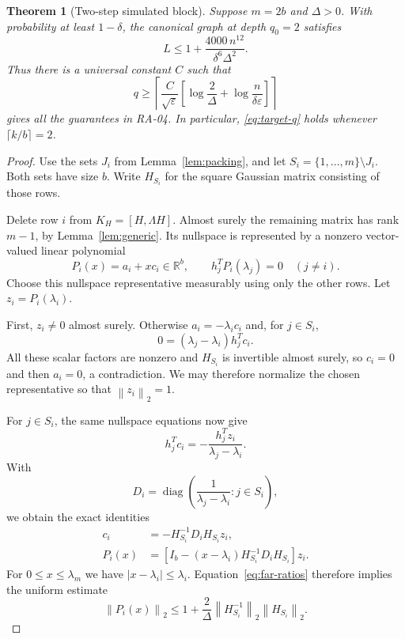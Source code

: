 \documentclass[11pt]{article}
\newtheorem{theorem}{Theorem}[section]
\theoremstyle{definition}
\newcommand{\R}{\mathbb R}
\newcommand{\diag}{\operatorname{diag}}
\newcommand{\norm}[1]{\left\lVert #1\right\rVert}
\begin{document}
\begin{theorem}[Two-step simulated block]
\label{thm:t2}
Suppose $m=2b$ and $\Delta>0$. With probability at least $1-\delta$, the
canonical graph at depth $q_0=2$ satisfies
\begin{equation}
 L\leq 1+\frac{4000\,n^{12}}{\delta^6\Delta^2}.
 \label{eq:t2-L}
\end{equation}
Thus there is a universal constant $C$ such that
\begin{equation}
 q\geq\left\lceil\frac C{\sqrt\varepsilon}
       \left[\log\frac2\Delta+\log\frac n{\delta\varepsilon}\right]
       \right\rceil
 \label{eq:t2-q}
\end{equation}
gives all the guarantees in RA-04. In particular,
\eqref{eq:target-q} holds whenever $\lceil k/b\rceil=2$.
\end{theorem}
\begin{proof}
Use the sets $J_i$ from Lemma~\ref{lem:packing}, and let
$S_i=\{1,\ldots,m\}\setminus J_i$. Both sets have size $b$.
Write $H_{S_i}$ for the square Gaussian matrix consisting of those rows.

Delete row $i$ from $K_H=[H,\Lambda H]$. Almost surely the remaining matrix
has rank $m-1$, by Lemma~\ref{lem:generic}. Its nullspace is represented by a
nonzero vector-valued linear polynomial
\[
 P_i(x)=a_i+xc_i\in\R^b,
 \qquad h_j^TP_i(\lambda_j)=0\quad(j\ne i).
\]
Choose this nullspace representative measurably using only the other rows.
Let $z_i=P_i(\lambda_i)$.

First, $z_i\ne0$ almost surely. Otherwise $a_i=-\lambda_i c_i$ and, for
$j\in S_i$,
\[
 0=(\lambda_j-\lambda_i)h_j^Tc_i.
\]
All these scalar factors are nonzero and $H_{S_i}$ is invertible almost
surely, so $c_i=0$ and then $a_i=0$, a contradiction. We may therefore
normalize the chosen representative so that $\norm{z_i}_2=1$.

For $j\in S_i$, the same nullspace equations now give
\[
 h_j^Tc_i=-\frac{h_j^Tz_i}{\lambda_j-\lambda_i}.
\]
With
\[
 D_i=\diag\left(\frac1{\lambda_j-\lambda_i}:j\in S_i\right),
\]
we obtain the exact identities
\begin{align}
 c_i&=-H_{S_i}^{-1}D_iH_{S_i}z_i,\label{eq:t2-slope}\\
 P_i(x)&=\left[I_b-(x-\lambda_i)H_{S_i}^{-1}D_iH_{S_i}\right]z_i.
 \label{eq:t2-extrapolation}
\end{align}
For $0\leq x\leq\lambda_m$ we have $|x-\lambda_i|\leq\lambda_i$.
Equation~\eqref{eq:far-ratios} therefore implies the uniform estimate
\begin{equation}
 \norm{P_i(x)}_2\leq
       1+\frac2\Delta\norm{H_{S_i}^{-1}}_2\norm{H_{S_i}}_2.
 \label{eq:t2-P-bound}
\end{equation}


\end{proof}
\end{document}
